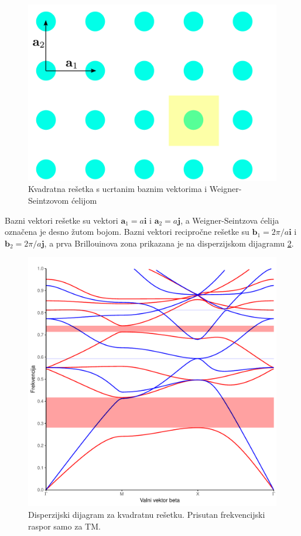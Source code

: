 \documentclass[utf8, seminar]{fer}
\begin{document}
\begin{figure}[h]
	\centering
	\includegraphics[width = 1.0\linewidth]{./images/square_lattice.pdf}
	\caption{Kvadratna rešetka s ucrtanim baznim vektorima i Weigner-Seintzovom
	ćelijom}
	\label{fig:square_lattice}
\end{figure}

Bazni vektori rešetke su vektori ${\mathbf{a}_1 = a \mathbf{i}}$ i
${\mathbf{a}_2= a \mathbf{j}}$, a Weigner-Seintzova ćelija označena je
desno žutom bojom. Bazni vektori recipročne rešetke su
${\mathbf{b}_1 = 2 \pi/a \mathbf{i}}$ i
${\mathbf{b}_2 = 2 \pi/a \mathbf{j}}$, a prva Brillouinova zona prikazana
je na disperzijskom dijagramu \ref{fig:square_band_diagram}.

\begin{figure}[h]
	\centering
	\includegraphics[width = 1.0\linewidth]{./images/square.pdf}
	\caption{Disperzijski dijagram za kvadratnu rešetku. Prisutan frekvencijski
	raspor samo za TM.}
	\label{fig:square_band_diagram}
\end{figure}
\end{document}
